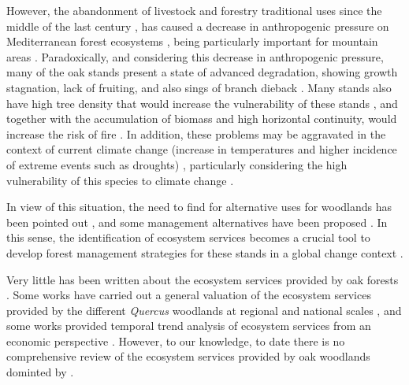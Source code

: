 However, the abandonment of livestock and forestry traditional uses since the middle of the last century \autocites{MacDonaldetal2000AgriculturalAbandonment}, has caused a decrease in anthropogenic pressure on Mediterranean forest ecosystems \autocites{ValbuenaCarabanaetal2010HistoricalRecent}, being particularly important for mountain areas \autocites{JimenezOlivenciaetal2015MedioSiglo,JimenezOlivenciaetal2015EvolucionUsos,Piasetal2014ColonizationAbandoned}. Paradoxically, and considering this decrease in anthropogenic pressure, many of the \Qp oak stands present a state of advanced degradation, showing growth stagnation, lack of fruiting, and also sings of branch dieback  \autocites{Canellasetal2004GrowthResponse, Bravoetal2008SelviculturaMontes, ValbuenaCarabanaGil2014EfectosGestion, PiqueVericat2015EvolutionPerspectives, Piqueetal2018Spain}. Many stands also have high tree density that would increase the vulnerability of these stands \autocite{McDowelletal2020PervasiveShifts}, and together with the accumulation of biomass and high horizontal continuity, would increase the risk of fire \autocites{Bravoetal2008SelviculturaMontes,GarciaJimenez20099230Robledales}. In addition, these problems may be aggravated in the context of current climate change (increase in temperatures and higher incidence of extreme events such as droughts) \autocites{IPCC2013ClimateChange,Spinonietal2018WillDrought}, particularly considering the high vulnerability of this species to climate change \autocites{Benitoetal2011SimulatingPotential,GarciaValdesetal2013ChasingMoving,SanchezdeDiosetal2009PresentFuture,GeaIzquierdoetal2013GrowthProjections}. 

In view of this situation, the need to find for alternative uses for \Qp woodlands has been pointed out \autocites{MesonMontoya1985VegetacionForestal,SanMigueletal2012BosquesMatorrales}, and some management alternatives have been proposed \autocite[\emph{e.g.} sylvopastoral uses,][]{HerreraCalvo2016UsoPastoral}. In this sense, the identification of ecosystem services becomes a crucial tool to develop forest management strategies for these stands in a global change context \autocites{Piqueetal2018Spain}. 

Very little has been written about the ecosystem services provided by oak forests \autocites{Maranonetal2012OakTrees,Maranonetal2012EstadoTendencia,MorenoLlorcaetal2012MontanaMediterranea}. Some works have carried out a general valuation of the ecosystem services provided by the different \emph{Quercus} woodlands at regional and national scales \autocite{SanMigueletal2012BosquesMatorrales,Maranonetal2012EstadoTendencia,Sousaetal2020EcosystemServices}, and some works provided temporal trend analysis of ecosystem services from an economic perspective \autocites{Caparrosetal2013EconomicsEcosystem}. However, to our knowledge, to date there is no comprehensive review of the ecosystem services provided by oak woodlands dominted by \Qp. 

